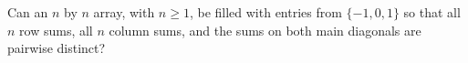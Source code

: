 Can an $n$ by $n$ array, with $n\ge1$, be filled with entries from $\{-1,0,1\}$ so that all $n$ row sums, all $n$ column sums, and the sums on both main diagonals are pairwise distinct?
